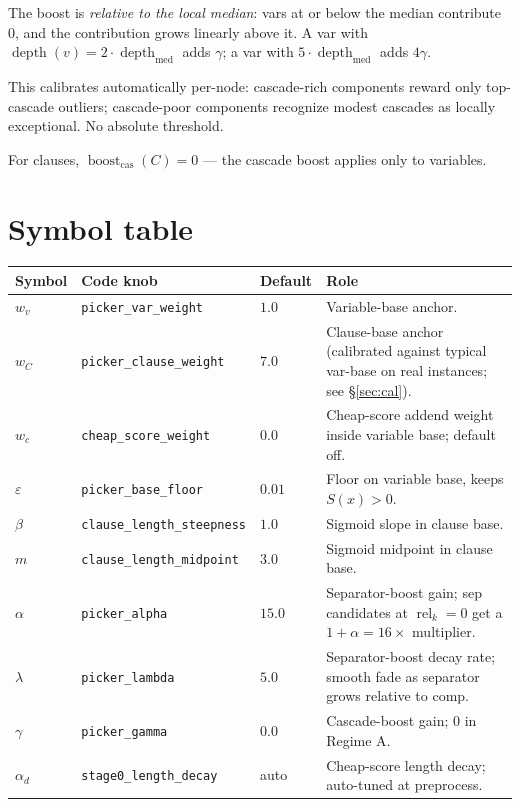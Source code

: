 \documentclass[11pt]{article}
\begin{document}
The boost is \emph{relative to the local median}: vars at or below the median
contribute $0$, and the contribution grows linearly above it. A var with
$\operatorname{depth}(v) = 2 \cdot \operatorname{depth}_{\mathrm{med}}$ adds $\gamma$;
a var with $5 \cdot \operatorname{depth}_{\mathrm{med}}$ adds $4\gamma$.

This calibrates automatically per-node: cascade-rich components reward only
top-cascade outliers; cascade-poor components recognize modest cascades as
locally exceptional. No absolute threshold.

For clauses, $\operatorname{boost}_{\text{cas}}(C) = 0$ --- the cascade boost
applies only to variables.

\section{Symbol table}

\begin{center}
\begin{tabular}{lll>{\raggedright\arraybackslash}p{8cm}}
\toprule
Symbol & Code knob & Default & Role \\
\midrule
$w_v$         & \texttt{picker\_var\_weight}        & $1.0$   & Variable-base anchor. \\
$w_C$         & \texttt{picker\_clause\_weight}     & $7.0$   & Clause-base anchor (calibrated against typical var-base on real instances; see \S\ref{sec:cal}). \\
$w_c$         & \texttt{cheap\_score\_weight}       & $0.0$   & Cheap-score addend weight inside variable base; default off. \\
$\varepsilon$ & \texttt{picker\_base\_floor}        & $0.01$  & Floor on variable base, keeps $S(x) > 0$. \\
$\beta$       & \texttt{clause\_length\_steepness}  & $1.0$   & Sigmoid slope in clause base. \\
$m$           & \texttt{clause\_length\_midpoint}   & $3.0$   & Sigmoid midpoint in clause base. \\
$\alpha$      & \texttt{picker\_alpha}              & $15.0$  & Separator-boost gain; sep candidates at $\operatorname{rel}_k = 0$ get a $1+\alpha = 16\times$ multiplier. \\
$\lambda$     & \texttt{picker\_lambda}             & $5.0$   & Separator-boost decay rate; smooth fade as separator grows relative to comp. \\
$\gamma$      & \texttt{picker\_gamma}              & $0.0$   & Cascade-boost gain; $0$ in Regime A. \\
$\alpha_d$    & \texttt{stage0\_length\_decay}      & auto    & Cheap-score length decay; auto-tuned at preprocess. \\
\bottomrule
\end{tabular}
\end{center}
\end{document}
